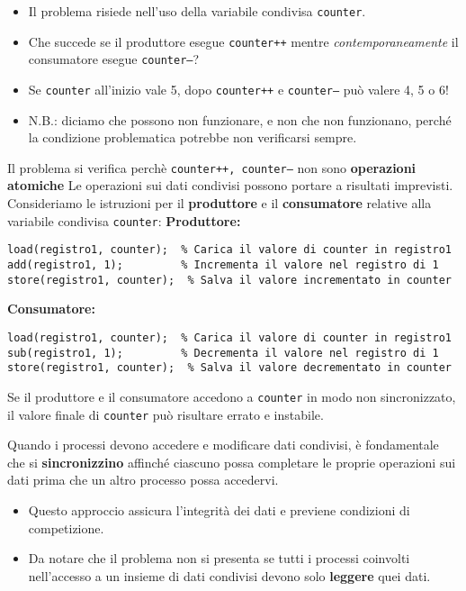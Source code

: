 \begin{itemize}
    \item Il problema risiede nell'uso della variabile condivisa \texttt{counter}.
    \item Che succede se il produttore esegue \texttt{counter++} mentre \textit{contemporaneamente} il consumatore esegue \texttt{counter--}?
    \item Se \texttt{counter} all'inizio vale 5, dopo \texttt{counter++} e \texttt{counter--} può valere 4, 5 o 6!
    \item N.B.: diciamo che possono non funzionare, e non che non funzionano, perché la condizione problematica potrebbe non verificarsi sempre.
\end{itemize}
Il problema si verifica perchè \texttt{counter++, counter--} non sono \textbf{operazioni atomiche}
Le operazioni sui dati condivisi possono portare a risultati imprevisti. Consideriamo le istruzioni per il \textbf{produttore} e il \textbf{consumatore} relative alla variabile condivisa \texttt{counter}:
\textbf{Produttore:}
\begin{verbatim}
load(registro1, counter);  % Carica il valore di counter in registro1
add(registro1, 1);         % Incrementa il valore nel registro di 1
store(registro1, counter);  % Salva il valore incrementato in counter
\end{verbatim}
\textbf{Consumatore:}
\begin{verbatim}
load(registro1, counter);  % Carica il valore di counter in registro1
sub(registro1, 1);         % Decrementa il valore nel registro di 1
store(registro1, counter);  % Salva il valore decrementato in counter
\end{verbatim}

Se il produttore e il consumatore accedono a \texttt{counter} in modo non sincronizzato, il valore finale di \texttt{counter} può risultare errato e instabile.


Quando i processi devono accedere e modificare dati condivisi, è fondamentale che si \textbf{sincronizzino} affinché ciascuno possa completare le proprie operazioni sui dati prima che un altro processo possa accedervi.

\begin{itemize}
    \item Questo approccio assicura l'integrità dei dati e previene condizioni di competizione.
    \item Da notare che il problema non si presenta se tutti i processi coinvolti nell'accesso a un insieme di dati condivisi devono solo \textbf{leggere} quei dati.
\end{itemize}


